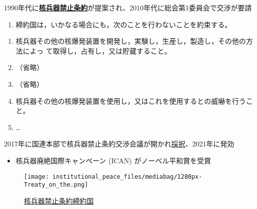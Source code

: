 \documentclass[
  xelatex,
  ja=standard]{bxjsarticle}
\providecommand{\tightlist}{%
  \setlength{\itemsep}{0pt}\setlength{\parskip}{0pt}}\usepackage{longtable,booktabs,array}
\begin{document}
1990年代に\href{https://www.mofa.go.jp/mofaj/dns/ac_d/page23_002807.html}{\textbf{核兵器禁止条約}}が提案され、2010年代に総会第1委員会で交渉が要請

\begin{tcolorbox}[enhanced jigsaw, left=2mm, toprule=.15mm, opacityback=0, colframe=quarto-callout-note-color-frame, opacitybacktitle=0.6, breakable, coltitle=black, colbacktitle=quarto-callout-note-color!10!white, colback=white, bottomtitle=1mm, toptitle=1mm, titlerule=0mm, title=\textcolor{quarto-callout-note-color}{\faInfo}\hspace{0.5em}{\href{https://www.mofa.go.jp/mofaj/dns/ac_d/page23_002807.html}{\textbf{核兵器禁止条約}}　第1条}, arc=.35mm, rightrule=.15mm, bottomrule=.15mm, leftrule=.75mm]

\begin{enumerate}
\def\labelenumi{\arabic{enumi}.}
\tightlist
\item
  締約国は，いかなる場合にも，次のことを行わないことを約束する。
\end{enumerate}

\begin{enumerate}
\def\labelenumi{\alph{enumi}.}
\tightlist
\item
  核兵器その他の核爆発装置を開発し，実験し，生産し，製造し，その他の方法によっ
  て取得し，占有し，又は貯蔵すること。
\item
  （省略）
\item
  （省略）
\item
  核兵器その他の核爆発装置を使用し，又はこれを使用するとの威嚇を行うこと。
\item
  \ldots{}
\end{enumerate}

\end{tcolorbox}

2017年に国連本部で核兵器禁止条約交渉会議が開かれ\href{https://www.mofa.go.jp/mofaj/files/000433139.pdf}{採択}、2021年に発効

\begin{itemize}
\tightlist
\item
  核兵器廃絶国際キャンペーン (ICAN) がノーベル平和賞を受賞
\end{itemize}

\begin{figure}[htpb]

{\centering \texttt{[image: institutional\_peace\_files/mediabag/1280px-Treaty\_on\_the.png]}

}

\caption{\href{https://commons.wikimedia.org/wiki/File:Treaty_on_the_Prohibition_of_Nuclear_Weapons_members.svg}{核兵器禁止条約締約国}}

\end{figure}
\end{document}
